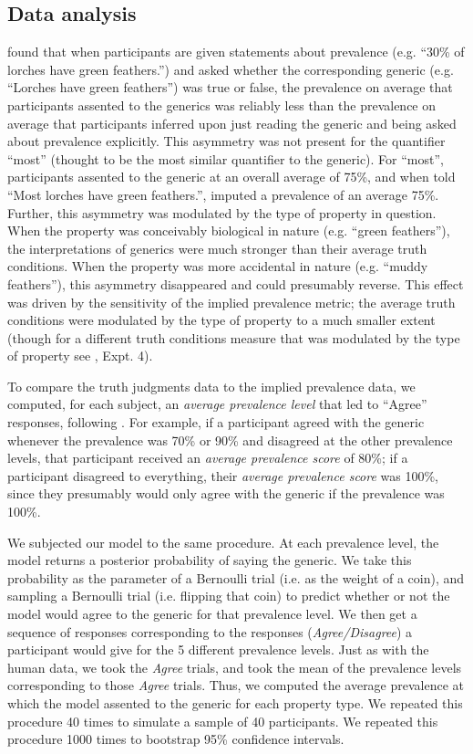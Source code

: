\documentclass[10pt,letterpaper]{article}
\begin{document}
\subsection{Data analysis}

 found that when participants are given statements about prevalence (e.g. ``30\% of lorches have green feathers.'') and asked whether the corresponding generic (e.g. ``Lorches have green feathers'') was true or false, the prevalence on average that participants assented to the generics was reliably less than the prevalence on average that participants inferred upon just reading the generic and being asked about prevalence explicitly. 
This asymmetry was not present for the quantifier ``most'' (thought to be the most similar quantifier to the generic). 
For ``most'', participants assented to the generic at an overall average of 75\%, and when told ``Most lorches have green feathers.'', imputed a prevalence of an average 75\%.
Further, this asymmetry was modulated by the type of property in question. 
When the property was conceivably biological in nature (e.g. ``green feathers''), the interpretations of generics were much stronger than their average truth conditions.  
When the property was more accidental in nature (e.g. ``muddy feathers''), this asymmetry disappeared and could presumably reverse.
This effect was driven by the sensitivity of the implied prevalence metric; the average truth conditions were modulated by the type of property to a much smaller extent (though for a different truth conditions measure that was modulated by the type of property see , Expt. 4).

To compare the truth judgments data to the implied prevalence data, we computed, for each subject, an \emph{average prevalence level} that led to ``Agree'' responses, following .
For example, if a participant agreed with the generic whenever the prevalence was 70\% or 90\% and disagreed at the other prevalence levels, that participant received an \emph{average prevalence score} of 80\%; if a participant disagreed to everything, their \emph{average prevalence score} was 100\%, since they presumably would only agree with the generic if the prevalence was 100\%.

We subjected our model to the same procedure. 
At each prevalence level, the model returns a posterior probability of saying the generic. 
We take this probability as the parameter of a Bernoulli trial (i.e. as the weight of a coin), and sampling a Bernoulli trial (i.e. flipping that coin) to predict whether or not the model would agree to the generic for that prevalence level. 
We then get a sequence of responses corresponding to the responses (\emph{Agree/Disagree}) a participant would give for the 5 different prevalence levels.
Just as with the human data, we took the \emph{Agree} trials, and took the mean of the prevalence levels corresponding to those \emph{Agree} trials. 
Thus, we computed the average prevalence at which the model assented to the generic for each property type. 
We repeated this procedure 40 times to simulate a sample of 40 participants. 
We repeated this procedure 1000 times to bootstrap 95\% confidence intervals.
\end{document}
